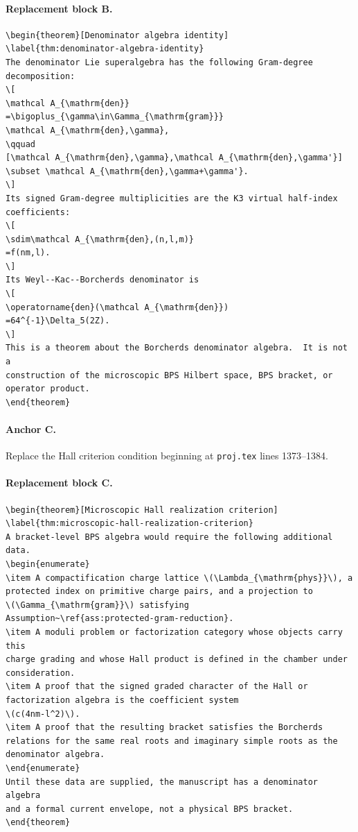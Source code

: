 \paragraph{Replacement block B.}
\begin{verbatim}
\begin{theorem}[Denominator algebra identity]
\label{thm:denominator-algebra-identity}
The denominator Lie superalgebra has the following Gram-degree
decomposition:
\[
\mathcal A_{\mathrm{den}}
=\bigoplus_{\gamma\in\Gamma_{\mathrm{gram}}}
\mathcal A_{\mathrm{den},\gamma},
\qquad
[\mathcal A_{\mathrm{den},\gamma},\mathcal A_{\mathrm{den},\gamma'}]
\subset \mathcal A_{\mathrm{den},\gamma+\gamma'}.
\]
Its signed Gram-degree multiplicities are the K3 virtual half-index
coefficients:
\[
\sdim\mathcal A_{\mathrm{den},(n,l,m)}
=f(nm,l).
\]
Its Weyl--Kac--Borcherds denominator is
\[
\operatorname{den}(\mathcal A_{\mathrm{den}})
=64^{-1}\Delta_5(2Z).
\]
This is a theorem about the Borcherds denominator algebra.  It is not a
construction of the microscopic BPS Hilbert space, BPS bracket, or
operator product.
\end{theorem}
\end{verbatim}

\paragraph{Anchor C.}
Replace the Hall criterion condition beginning at
\texttt{proj.tex} lines 1373--1384.

\paragraph{Replacement block C.}
\begin{verbatim}
\begin{theorem}[Microscopic Hall realization criterion]
\label{thm:microscopic-hall-realization-criterion}
A bracket-level BPS algebra would require the following additional data.
\begin{enumerate}
\item A compactification charge lattice \(\Lambda_{\mathrm{phys}}\), a
protected index on primitive charge pairs, and a projection to
\(\Gamma_{\mathrm{gram}}\) satisfying
Assumption~\ref{ass:protected-gram-reduction}.
\item A moduli problem or factorization category whose objects carry this
charge grading and whose Hall product is defined in the chamber under
consideration.
\item A proof that the signed graded character of the Hall or
factorization algebra is the coefficient system
\(c(4nm-l^2)\).
\item A proof that the resulting bracket satisfies the Borcherds
relations for the same real roots and imaginary simple roots as the
denominator algebra.
\end{enumerate}
Until these data are supplied, the manuscript has a denominator algebra
and a formal current envelope, not a physical BPS bracket.
\end{theorem}
\end{verbatim}

